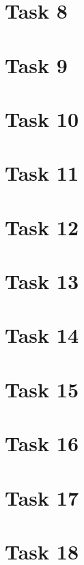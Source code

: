 \documentclass[a4paper,12pt,oneside,onecolumn]{article} %
\begin{document}
\section*{Task 8}


\section*{Task 9}
%

\section*{Task 10}
%

\section*{Task 11}
%

\section*{Task 12}
%

\section*{Task 13}
%

\section*{Task 14}
%

\section*{Task 15}
%

\section*{Task 16}
%

\section*{Task 17}
%

\section*{Task 18}
%
\end{document}
